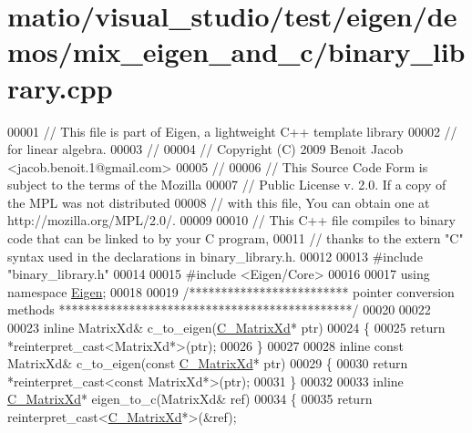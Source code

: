 \hypertarget{matio_2visual__studio_2test_2eigen_2demos_2mix__eigen__and__c_2binary__library_8cpp_source}{}\section{matio/visual\+\_\+studio/test/eigen/demos/mix\+\_\+eigen\+\_\+and\+\_\+c/binary\+\_\+library.cpp}
\label{matio_2visual__studio_2test_2eigen_2demos_2mix__eigen__and__c_2binary__library_8cpp_source}

\begin{DoxyCode}
00001 \textcolor{comment}{// This file is part of Eigen, a lightweight C++ template library}
00002 \textcolor{comment}{// for linear algebra.}
00003 \textcolor{comment}{//}
00004 \textcolor{comment}{// Copyright (C) 2009 Benoit Jacob <jacob.benoit.1@gmail.com>}
00005 \textcolor{comment}{//}
00006 \textcolor{comment}{// This Source Code Form is subject to the terms of the Mozilla}
00007 \textcolor{comment}{// Public License v. 2.0. If a copy of the MPL was not distributed}
00008 \textcolor{comment}{// with this file, You can obtain one at http://mozilla.org/MPL/2.0/.}
00009 
00010 \textcolor{comment}{// This C++ file compiles to binary code that can be linked to by your C program,}
00011 \textcolor{comment}{// thanks to the extern "C" syntax used in the declarations in binary\_library.h.}
00012 
00013 \textcolor{preprocessor}{#include "binary\_library.h"}
00014 
00015 \textcolor{preprocessor}{#include <Eigen/Core>}
00016 
00017 \textcolor{keyword}{using namespace }\hyperlink{namespace_eigen}{Eigen};
00018 
00019 \textcolor{comment}{/************************* pointer conversion methods **********************************************/}
00020 
00022 
00023 \textcolor{keyword}{inline} MatrixXd& c\_to\_eigen(\hyperlink{struct_c___matrix_xd}{C\_MatrixXd}* ptr)
00024 \{
00025   \textcolor{keywordflow}{return} *\textcolor{keyword}{reinterpret\_cast<}MatrixXd*\textcolor{keyword}{>}(ptr);
00026 \}
00027 
00028 \textcolor{keyword}{inline} \textcolor{keyword}{const} MatrixXd& c\_to\_eigen(\textcolor{keyword}{const} \hyperlink{struct_c___matrix_xd}{C\_MatrixXd}* ptr)
00029 \{
00030   \textcolor{keywordflow}{return} *\textcolor{keyword}{reinterpret\_cast<}\textcolor{keyword}{const }MatrixXd*\textcolor{keyword}{>}(ptr);
00031 \}
00032 
00033 \textcolor{keyword}{inline} \hyperlink{struct_c___matrix_xd}{C\_MatrixXd}* eigen\_to\_c(MatrixXd& ref)
00034 \{
00035   \textcolor{keywordflow}{return} \textcolor{keyword}{reinterpret\_cast<}\hyperlink{struct_c___matrix_xd}{C\_MatrixXd}*\textcolor{keyword}{>}(&ref);

\end{DoxyCode}
